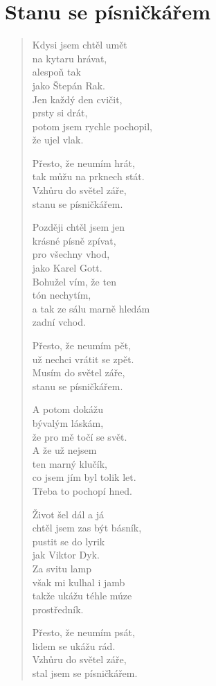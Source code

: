 \section{Stanu se písničkářem}

\thispagestyle{empty}

\begin{multicols}{2}

\begin{verse}

Kdysi jsem chtěl umět\\
na kytaru hrávat,\\
alespoň tak\\
jako Štepán Rak.\\
Jen každý den cvičit,\\
prsty si drát,\\
potom jsem rychle pochopil,\\
že ujel vlak.

Přesto, že neumím hrát,\\
tak můžu na prknech stát.\\
Vzhůru do světel záře, \\
stanu se písničkářem.

Později chtěl jsem jen\\
krásné písně zpívat,\\
pro všechny vhod,\\
jako Karel Gott.\\
Bohužel vím, že ten \\
tón nechytím,\\
a tak ze sálu marně hledám\\
zadní vchod.

Přesto, že neumím pět,\\
už nechci vrátit se zpět.\\
Musím do světel záře, \\
stanu se písničkářem.

\columnbreak

A potom dokážu\\
bývalým láskám, \\
že pro mě točí se svět.\\
A že už nejsem\\
ten marný klučík,\\
co jsem jím byl tolik let.\\
Třeba to pochopí hned.

Život šel dál a já \\
chtěl jsem zas být básník,\\
pustit se do lyrik\\
jak Viktor Dyk.\\
Za svitu lamp\\ 
však mi kulhal i jamb\\
takže ukážu téhle múze\\
prostředník.

Přesto, že neumím psát,\\
lidem se ukážu rád.\\
Vzhůru do světel záře, \\
stal jsem se písničkářem.


\end{verse}

\end{multicols}